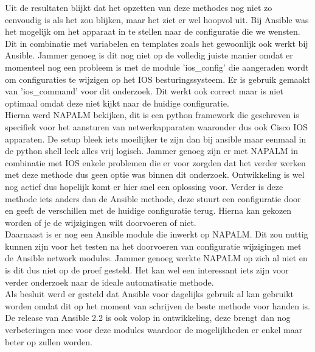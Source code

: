Uit de resultaten blijkt dat het opzetten van deze methodes nog niet zo eenvoudig is als het zou blijken, maar het ziet er wel hoopvol uit. Bij Ansible was het mogelijk om het apparaat in te stellen naar de configuratie die we wensten. Dit in combinatie met variabelen en templates zoals het gewoonlijk ook werkt bij Ansible. Jammer genoeg is dit nog niet op de volledig juiste manier omdat er momenteel nog een probleem is met de module 'ios\_config' die aangeraden wordt om configuraties te wijzigen op het IOS besturingssysteem. Er is gebruik gemaakt van 'ios\_command' voor dit onderzoek. Dit werkt ook correct maar is niet optimaal omdat deze niet kijkt naar de huidige configuratie.
\\

Hierna werd NAPALM bekijken, dit is een python framework die geschreven is specifiek voor het aansturen van netwerkapparaten waaronder dus ook Cisco IOS apparaten. De setup bleek iets moeilijker te zijn dan bij ansible maar eenmaal in de python shell leek alles vrij logisch. Jammer genoeg zijn er met NAPALM in combinatie met IOS enkele problemen die er voor zorgden dat het verder werken met deze methode dus geen optie was binnen dit onderzoek. Ontwikkeling is wel nog actief dus hopelijk komt er hier snel een oplossing voor. Verder is deze methode iets anders dan de Ansible methode, deze stuurt een configuratie door en geeft de verschillen met de huidige configuratie terug. Hierna kan gekozen worden of je de wijzigingen wilt doorvoeren of niet.
\\
Daarnaast is er nog een Ansible module die inwerkt op NAPALM. Dit zou nuttig kunnen zijn voor het testen na het doorvoeren van configuratie wijzigingen met de Ansible network modules. Jammer genoeg werkte NAPALM op zich al niet en is dit dus niet op de proef gesteld. Het kan wel een interessant iets zijn voor verder onderzoek naar de ideale automatisatie methode.
\\

Als besluit werd er gesteld dat Ansible voor dagelijks gebruik al kan gebruikt worden omdat dit op het moment van schrijven de beste methode voor handen is. De release van Ansible 2.2 is ook volop in ontwikkeling, deze brengt dan nog verbeteringen mee voor deze modules waardoor de mogelijkheden er enkel maar beter op zullen worden.